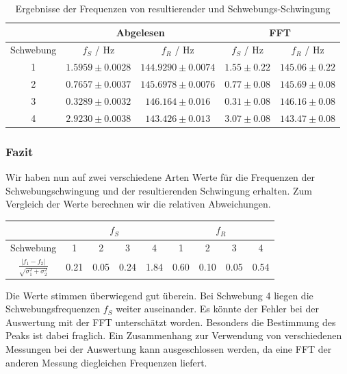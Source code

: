 \begin{table}[H]
\centering
\begin{tabular}{c|c|c|c|c}
& \multicolumn{2}{c|}{Abgelesen} & \multicolumn{2}{c}{FFT} \\
\hline
Schwebung & $f_S$ / Hz & $f_R$ / Hz & $f_S$ / Hz & $f_R$ / Hz \\
\hline
1 & $ 1.5959 \pm 0.0028$ & $ 144.9290 \pm 0.0074$ & $ 1.55 \pm 0.22$ & $ 145.06 \pm 0.22$ \\
2 & $ 0.7657 \pm 0.0037$ & $ 145.6978 \pm 0.0076$ & $ 0.77 \pm 0.08$ & $ 145.69 \pm 0.08$ \\
3 & $ 0.3289 \pm 0.0032$ & $ 146.164 \pm 0.016$ & $ 0.31 \pm 0.08$ & $ 146.16 \pm 0.08$ \\
4 & $ 2.9230 \pm 0.0038$ & $ 143.426 \pm 0.013$ & $ 3.07 \pm 0.08$ & $ 143.47 \pm 0.08$ 
\end{tabular}
\caption{Ergebnisse der Frequenzen von resultierender und Schwebungs-Schwingung}
\label{tabFreqErg}
\end{table}



\subsubsection{Fazit}

Wir haben nun auf zwei verschiedene Arten Werte für die Frequenzen der Schwebungschwingung und der resultierenden Schwingung erhalten. Zum Vergleich der Werte berechnen wir die relativen Abweichungen.

\begin{table}[H]
\centering
\begin{tabular}{c|c|c|c|c|c|c|c|c}
& \multicolumn{4}{c|}{$f_S$} & \multicolumn{4}{c}{$f_R$} \\
\hline
Schwebung & 1 & 2 & 3 & 4 & 1 & 2 & 3 & 4 \\
\hline
$\frac{|f_1-f_2|}{\sqrt{\sigma_1^2+\sigma_2^2}}$ & 0.21 & 0.05 & 0.24 & 1.84 & 0.60 & 0.10 & 0.05 & 0.54 
\end{tabular}
\end{table}
Die Werte stimmen überwiegend gut überein. Bei Schwebung 4 liegen die Schwebungsfrequenzen $f_S$ weiter auseinander. Es könnte der Fehler bei der Auswertung mit der FFT unterschätzt worden. Besonders die Bestimmung des Peaks ist dabei fraglich. Ein Zusammenhang zur Verwendung von verschiedenen Messungen bei der Auswertung kann ausgeschlossen werden, da eine FFT der anderen Messung diegleichen Frequenzen liefert. 



